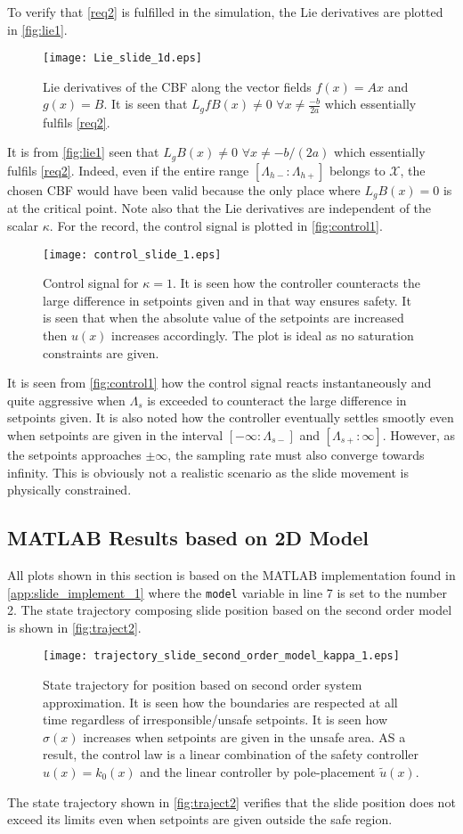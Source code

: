 To verify that \autoref{req2} is fulfilled in the simulation, the Lie derivatives are plotted in \autoref{fig:lie1}.
\begin{figure}[H]
	\center
		\texttt{[image: Lie\_slide\_1d.eps]}
	\caption{Lie derivatives of the CBF along the vector fields $f(x) = Ax$ and $g(x)=B$. It is seen that $L_gfB(x) \neq 0 \,\, \forall x \neq \frac{-b}{2a}$ which essentially fulfils \autoref{req2}.}
	\label{fig:lie1}
\end{figure}
It is from \autoref{fig:lie1} seen that $L_gB(x) \neq 0 \,\, \forall x \neq -b/(2a)$ which essentially fulfils \autoref{req2}. Indeed, even if the entire range $[\Lambda_{h-}:\Lambda_{h+}]$ belongs to $\mathcal{X}$, the chosen CBF would have been valid because the only place where $L_gB(x) = 0$ is at the critical point. Note also that the Lie derivatives are independent of the scalar $\kappa$.
For the record, the control signal is plotted in \autoref{fig:control1}.
\begin{figure}[H]
	\center
		\texttt{[image: control\_slide\_1.eps]}
	\caption{Control signal for $\kappa=1$. It is seen how the controller counteracts the large difference in setpoints given and in that way ensures safety. It is seen that when the absolute value of the setpoints are increased then $u(x)$ increases accordingly. The plot is ideal as no saturation constraints are given.}
	\label{fig:control1}
\end{figure}
It is seen from \autoref{fig:control1} how the control signal reacts instantaneously and quite aggressive when $\Lambda_s$ is exceeded to counteract the large difference in setpoints given. It is also noted how the controller eventually settles smootly even when setpoints are given in the interval $[-\infty:\Lambda_{s-}]$ and $[\Lambda_{s+}:\infty]$. However, as the setpoints approaches $\pm \infty$, the sampling rate must also converge towards infinity. This is obviously not a realistic scenario as the slide movement is physically constrained.
\subsection{MATLAB Results based on 2D Model}
All plots shown in this section is based on the MATLAB implementation found in \autoref{app:slide_implement_1} where the \texttt{model} variable in line 7 is set to the number 2. The state trajectory composing slide position based on the second order model is shown in \autoref{fig:traject2}.
\begin{figure}[H]
	\center
		\texttt{[image: trajectory\_slide\_second\_order\_model\_kappa\_1.eps]}
	\caption{State trajectory for position based on second order system approximation. It is seen how the boundaries are respected at all time regardless of irresponsible/unsafe setpoints. It is seen how $\sigma(x)$ 	increases when setpoints are given in the unsafe area. AS a result, the control law is a linear combination of the safety controller $u(x) = k_0(x)$ and the linear controller by pole-placement $\tilde{u}(x)$.}
	\label{fig:traject2}
\end{figure}
The state trajectory shown in \autoref{fig:traject2} verifies that the slide position does not exceed its limits even when setpoints are given outside the safe region.

